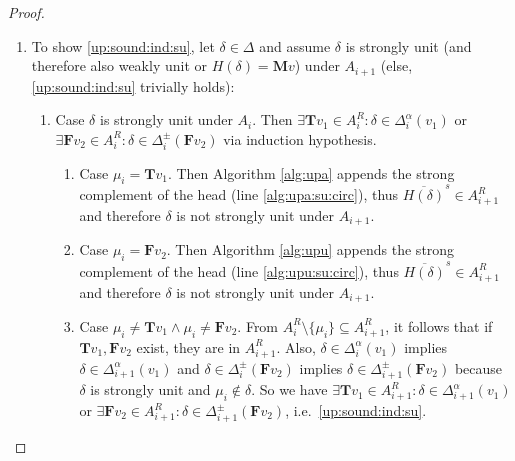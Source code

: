 \documentclass{vutinfth} %
\newcommand{\negstrong}[1]{\overline{#1}^s}
\newcommand{\ass}{A}
\newcommand{\bT}{\mathbf{T}}
\newcommand{\bM}{\mathbf{M}}
\newcommand{\bF}{\mathbf{F}}
\newcommand{\contradiction}{\Lightning}
\newcommand{\dpm}{\Delta^\pm}
\newcommand{\dal}{\Delta^\alpha}
\newcommand{\headf}{H}
\newcommand{\sgl}{\mu}
\begin{document}
\begin{proof}
\begin{enumerate}
\item To show \ref{up:sound:ind:su}, let $\delta \in \Delta$ and assume $\delta$ is strongly unit (and therefore also weakly unit or $\headf(\delta) = \bM v$) under $\ass_{i+1}$ (else, \ref{up:sound:ind:su} trivially holds):
\begin{enumerate}
	\item Case $\delta$ is strongly unit under $\ass_i$. Then $\exists {\bT v_1} \in \ass_i^R : \delta \in \dal_i(v_1)$ or $\exists {\bF v_2} \in \ass_i^R : \delta \in \dpm_i({\bF v_2})$ via induction hypothesis.
	\begin{enumerate}
		\item Case $\sgl_i = {\bT v_1}$. Then Algorithm \ref{alg:upa} appends the strong complement of the head (line \ref{alg:upa:su:circ}), thus $\negstrong{\headf(\delta)} \in A_{i+1}^R$ and therefore $\delta$ is not strongly unit under $A_{i+1}$. \contradiction
		\item Case $\sgl_i = {\bF v_2}$. Then Algorithm \ref{alg:upu} appends the strong complement of the head (line \ref{alg:upu:su:circ}), thus $\negstrong{\headf(\delta)} \in A_{i+1}^R$ and therefore $\delta$ is not strongly unit under $A_{i+1}$. \contradiction
		\item Case $\sgl_i \not = {\bT v_1} \wedge \sgl_i \not = {\bF v_2}$.
		From $\ass_{i}^R \setminus \{ \sgl_i \} \subseteq \ass_{i+1}^R$, it follows that if ${\bT v_1}, {\bF v_2}$ exist, they are in $\ass_{i+1}^R$. Also, $\delta \in \dal_i(v_1)$ implies $\delta \in \dal_{i+1}(v_1)$ and $\delta \in \dpm_i({\bF v_2})$ implies $\delta \in \dpm_{i+1}({\bF v_2})$ because $\delta$ is strongly unit and $\sgl_i \not \in \delta$. So we have $\exists {\bT v_1} \in \ass_{i+1}^R : \delta \in \dal_{i+1}(v_1)$ or $\exists {\bF v_2} \in \ass_{i+1}^R : \delta \in \dpm_{i+1}({\bF v_2})$, i.e.~\ref{up:sound:ind:su}. %
	\end{enumerate}
	

\end{enumerate}
\end{enumerate}
\end{proof}
\end{document}
